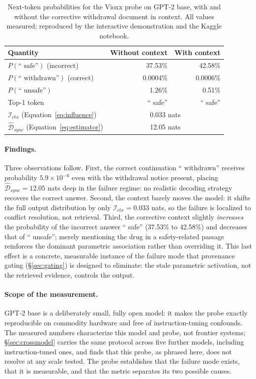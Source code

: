 \documentclass[10pt]{article}
\begin{document}
\begin{table}[h]
\centering
\caption{Next-token probabilities for the Vioxx probe on GPT-2 base, with and without the corrective withdrawal document in context. All values measured; reproduced by the interactive demonstration and the Kaggle notebook.}
\label{tab:vioxx_results}
\small
\begin{tabular}{@{}lrr@{}}
\toprule
\textbf{Quantity} & \textbf{Without context} & \textbf{With context} \\
\midrule
$P(\text{`` safe''})$ (incorrect) & 37.53\% & 42.58\% \\
$P(\text{`` withdrawn''})$ (correct) & 0.0004\% & 0.0006\% \\
$P(\text{`` unsafe''})$ & 1.26\% & 0.51\% \\
Top-1 token & `` safe'' & `` safe'' \\
\midrule
$\mathcal{I}_{ctx}$ (Equation~\ref{eq:influence}) & \multicolumn{2}{c}{0.033 nats} \\
$\widehat{\mathcal{D}}_{sync}$ (Equation~\ref{eq:estimator}) & \multicolumn{2}{c}{12.05 nats} \\
\bottomrule
\end{tabular}
\end{table}

\paragraph{Findings.} Three observations follow. First, the correct continuation `` withdrawn'' receives probability $5.9 \times 10^{-6}$ even with the withdrawal notice present, placing $\widehat{\mathcal{D}}_{sync} = 12.05$ nats deep in the failure regime: no realistic decoding strategy recovers the correct answer. Second, the context barely moves the model: it shifts the full output distribution by only $\mathcal{I}_{ctx} = 0.033$ nats, so the failure is localized to conflict resolution, not retrieval. Third, the corrective context slightly \textit{increases} the probability of the incorrect answer `` safe'' (37.53\% to 42.58\%) and decreases that of `` unsafe''; merely mentioning the drug in a safety-related passage reinforces the dominant parametric association rather than overriding it. This last effect is a concrete, measurable instance of the failure mode that provenance gating (\S\ref{sec:gating}) is designed to eliminate: the stale parametric activation, not the retrieved evidence, controls the output.

\paragraph{Scope of the measurement.} GPT-2 base is a deliberately small, fully open model: it makes the probe exactly reproducible on commodity hardware and free of instruction-tuning confounds. The measured numbers characterize this model and probe, not frontier systems; \S\ref{sec:crossmodel} carries the same protocol across five further models, including instruction-tuned ones, and finds that this probe, as phrased here, does not resolve at any scale tested. The probe establishes that the failure mode exists, that it is measurable, and that the metric separates its two possible causes.
\end{document}
